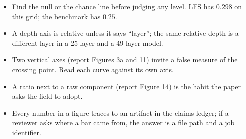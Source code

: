 \begin{itemize}[leftmargin=1.2em]
\item Find the null or the chance line before judging any level. LFS has
$0.298$ on this grid; the benchmark has $0.25$.
\item A depth axis is relative unless it says ``layer''; the same relative
depth is a different layer in a 25-layer and a 49-layer model.
\item Two vertical axes (report Figures 3a and 11) invite a false measure of
the crossing point. Read each curve against its own axis.
\item A ratio next to a raw component (report Figure 14) is the habit the
paper asks the field to adopt.
\item Every number in a figure traces to an artifact in the claims ledger;
if a reviewer asks where a bar came from, the answer is a file path and a job
identifier.
\end{itemize}
